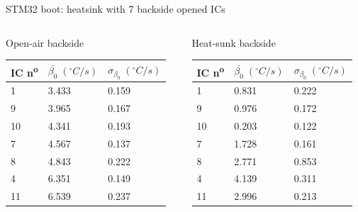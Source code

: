 \begin{frame}{STM32 boot: heatsink with 7 backside opened ICs}
	\begin{columns}
		\begin{column}{0.5\textwidth}
			\centering
			Open-air backside
			\begin{table}[]
				\centering
				\begin{tabular}{|l|l|l|}
					\hline \rule{0pt}{12pt} IC n\textsuperscript{o} & $\bar{\beta_0} \; (^{\circ} C/s)$ & $\sigma_{\beta_0} \; (^{\circ} C/s)$  \\ \hline
					1         & 3.433  & 0.159    \\ \hline
					9         & 3.965  & 0.167    \\ \hline
					10       & 4.341  & 0.193    \\ \hline
					7         & 4.567  & 0.137    \\ \hline
					8         & 4.843  & 0.222    \\ \hline
					4         & 6.351  & 0.149    \\ \hline
					11       & 6.539  & 0.237    \\ \hline
				\end{tabular}
			\end{table}
		\end{column}
		\begin{column}{0.5\textwidth}
			\centering
			Heat-sunk backside
			\begin{table}[]
				\centering
				\begin{tabular}{|l|l|l|}
					\hline \rule{0pt}{12pt} IC n\textsuperscript{o} & $\bar{\beta_0} \; (^{\circ} C/s)$ & $\sigma_{\beta_0} \; (^{\circ} C/s)$  \\ \hline
					1         & 0.831  & 0.222    \\ \hline
					9         & 0.976  & 0.172    \\ \hline
					10       & 0.203  & 0.122    \\ \hline
					7         & 1.728  & 0.161    \\ \hline
					8         & 2.771  & 0.853    \\ \hline
					4         & 4.139  & 0.311    \\ \hline
					11       & 2.996  & 0.213    \\ \hline
				\end{tabular}
			\end{table}
		\end{column}
	\end{columns}
\end{frame}

